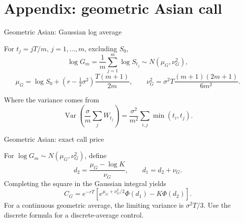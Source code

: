 \documentclass[handout,10pt,t,aspectratio=169]{beamer}
\newcommand{\Var}{\operatorname{Var}}
\begin{document}
\section{Appendix: geometric Asian call}

\begin{frame}{Geometric Asian: Gaussian log average}

    For \(t_j=jT/m\), \(j=1,\ldots,m\), excluding \(S_0\),
    \[\log G_m=\frac1m\sum_{j=1}^m\log S_{t_j}\sim N(\mu_G,\nu_G^2),\]
    \[\mu_G=\log S_0+(r-\tfrac12\sigma^2)\frac{T(m+1)}{2m},\qquad
      \nu_G^2=\sigma^2T\frac{(m+1)(2m+1)}{6m^2}.\]
    \begin{block}{Where the variance comes from}
    \[\Var\!\left(\frac\sigma m\sum_jW_{t_j}\right)
      =\frac{\sigma^2}{m^2}\sum_{i,j}\min(t_i,t_j).\]
    \end{block}
\end{frame}

\begin{frame}{Geometric Asian: exact call price}

    For \(\log G_m\sim N(\mu_G,\nu_G^2)\), define
    \[d_2=\frac{\mu_G-\log K}{\nu_G},\qquad d_1=d_2+\nu_G.\]
    Completing the square in the Gaussian integral yields
    \[\boxed{C_G=e^{-rT}\left[e^{\mu_G+\nu_G^2/2}\Phi(d_1)-K\Phi(d_2)\right].}\]
    For a continuous geometric average, the limiting variance is \(\sigma^2T/3\).
    Use the discrete formula for a discrete-average control.
\end{frame}
\end{document}
